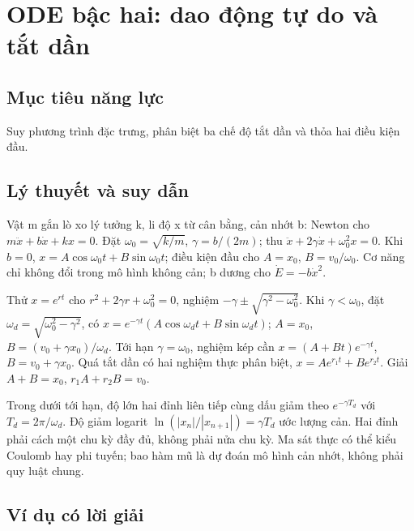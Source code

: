 \documentclass[11pt,a4paper,openany]{book}
\begin{document}
\chapter{ODE bậc hai: dao động tự do và tắt dần}
\section{Mục tiêu năng lực}
Suy phương trình đặc trưng, phân biệt ba chế độ tắt dần và thỏa hai điều kiện đầu.
\section{Lý thuyết và suy dẫn}
Vật m gắn lò xo lý tưởng k, li độ x từ cân bằng, cản nhớt b: Newton cho $m\ddot x+b\dot x+kx=0$. Đặt $\omega_0=\sqrt{k/m}$, $\gamma=b/(2m)$; thu $\ddot x+2\gamma\dot x+\omega_0^2x=0$. Khi $b=0$, $x=A\cos\omega_0t+B\sin\omega_0t$; điều kiện đầu cho $A=x_0$, $B=v_0/\omega_0$. Cơ năng chỉ không đổi trong mô hình không cản; b dương cho $\dot E=-b\dot x^2$.

Thử $x=e^{rt}$ cho $r^2+2\gamma r+\omega_0^2=0$, nghiệm $-\gamma\pm\sqrt{\gamma^2-\omega_0^2}$. Khi $\gamma<\omega_0$, đặt $\omega_d=\sqrt{\omega_0^2-\gamma^2}$, có $x=e^{-\gamma t}(A\cos\omega_dt+B\sin\omega_dt)$; $A=x_0$, $B=(v_0+\gamma x_0)/\omega_d$. Tới hạn $\gamma=\omega_0$, nghiệm kép cần $x=(A+Bt)e^{-\gamma t}$, $B=v_0+\gamma x_0$. Quá tắt dần có hai nghiệm thực phân biệt, $x=Ae^{r_1t}+Be^{r_2t}$. Giải $A+B=x_0$, $r_1A+r_2B=v_0$.

Trong dưới tới hạn, độ lớn hai đỉnh liên tiếp cùng dấu giảm theo $e^{-\gamma T_d}$ với $T_d=2\pi/\omega_d$. Độ giảm logarit $\ln(|x_n|/|x_{n+1}|)=\gamma T_d$ ước lượng cản. Hai đỉnh phải cách một chu kỳ đầy đủ, không phải nửa chu kỳ. Ma sát thực có thể kiểu Coulomb hay phi tuyến; bao hàm mũ là dự đoán mô hình cản nhớt, không phải quy luật chung.
\begin{center}
\end{center}
\section{Ví dụ có lời giải}
\end{document}
